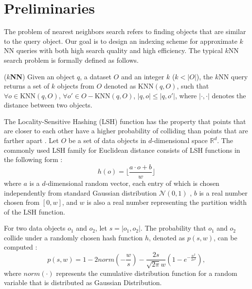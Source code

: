 \section{Preliminaries}
\label{sec:pre}

The problem of nearest neighbors search refers to finding objects that are similar to the query object. Our goal is to design an indexing scheme for approximate $k$NN queries with both high search quality and high efficiency. The typical $k$NN search problem is formally defined as follows.

\begin{definition}
\label{def:knn}
(\textbf{$k$NN}) Given an object $q$, a dataset $O$ and an integer $k$ ($k<|O|$), the $k$NN query returns a set of $k$ objects from $O$ denoted as $\text{KNN}(q,O)$, such that $\forall o\in \text{KNN}(q,O)$, $\forall o'\in O-\text{KNN}(q,O)$, $|q,o|\leq|q,o'|$, where $|\cdot,\cdot|$ denotes the distance between two objects.
\end{definition}


The Locality-Sensitive Hashing (LSH) function has the property that points that are closer to each other have a higher probability of colliding than points that are farther apart \cite{orilsh}. Let $O$ be a set of data objects in $d$-dimensional space $\mathbb{R}^d$. The commonly used LSH family for Euclidean distance consists of LSH functions in the following form
\cite{datar}:
%
\begin{equation}\label{eq:lsh}
%
    h(o)=\bigg\lfloor \frac{a\cdot o+b}{w}\bigg\rfloor
%
\end{equation}
%
where $a$ is a $d$-dimensional random vector, each entry of which is
chosen independently from standard Gaussian distribution $\mathcal{N}(0,1)$ \cite{stabledist},
$b$ is a real number chosen from $[0,w]$, and $w$ is also a real
number representing the partition width of the LSH function.

For two data objects $o_1$ and $o_2$, let $s=|o_1,o_2|$. The probability that $o_1$ and $o_2$ collide under a randomly chosen hash function $h$, denoted as $p(s,w)$, can be computed \cite{datar}:
\begin{equation}\label{eq:prob}
p(s,w)=1-2norm(-\frac{w}{s})-\frac{2s}{\sqrt{2\pi}w}(1-e^{-\frac{w^2}{2s^2}}),
\end{equation}
where $norm(\cdot)$ represents the cumulative distribution function for a random variable that is distributed as Gaussian Distribution.

